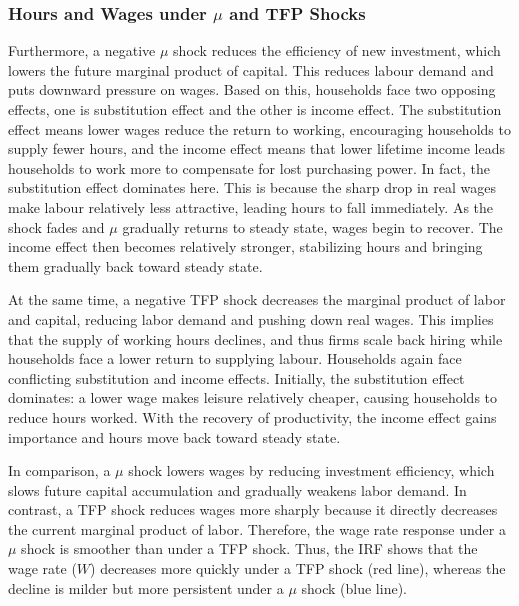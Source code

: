 \documentclass[12pt]{article}
\begin{document}
\subsubsection{Hours and Wages under $\mu$ and TFP Shocks}
Furthermore, a negative $\mu$ shock reduces the efficiency of new investment, which lowers the future marginal product of capital. This reduces labour demand and puts downward pressure on wages. 
Based on this, households face two opposing effects, one is substitution effect and the other is income effect.
The substitution effect means lower wages reduce the return to working, encouraging households to supply fewer hours, and the income effect means that lower lifetime income leads households to work more to compensate for lost purchasing power.
In fact, the substitution effect dominates here. This is because the sharp drop in real wages make labour relatively less attractive, leading hours to fall immediately.
As the shock fades and $\mu$ gradually returns to steady state, wages begin to recover. The income effect then becomes relatively stronger, stabilizing hours and bringing them gradually back toward steady state.

At the same time, a negative TFP shock decreases the marginal product of labor and capital, reducing labor demand and pushing down real wages.
This implies that the supply of working hours declines, and thus firms scale back hiring while households face a lower return to supplying labour. Households again face conflicting substitution and income effects. Initially, the substitution effect dominates: a lower wage makes leisure relatively cheaper, causing households to reduce hours worked.
With the recovery of productivity, the income effect gains importance and hours move back toward steady state.

In comparison, a $\mu$ shock lowers wages by reducing investment efficiency, which slows future capital accumulation and gradually weakens labor demand. In contrast, a TFP shock reduces wages more sharply because it directly decreases the current marginal product of labor. Therefore, the wage rate response under a $\mu$ shock is smoother than under a TFP shock. Thus, the IRF shows that the wage rate ($W$) decreases more quickly under a TFP shock (red line), whereas the decline is milder but more persistent under a $\mu$ shock (blue line).
\end{document}
